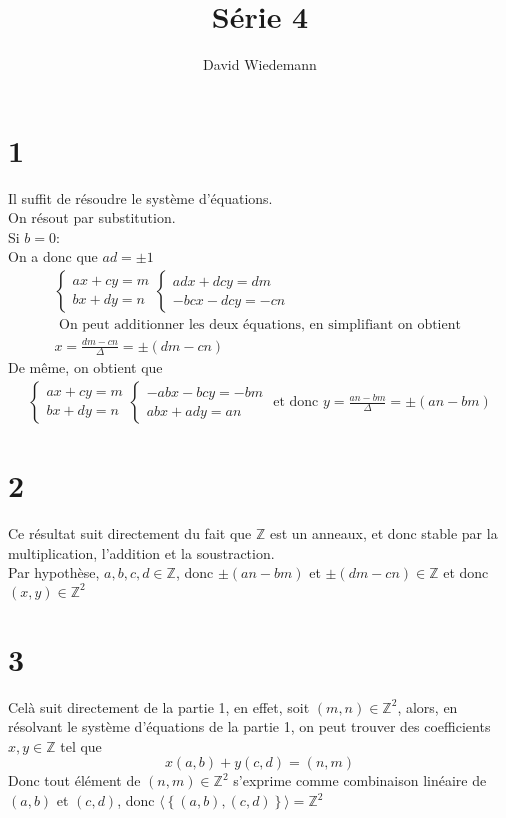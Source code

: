 \documentclass[11pt, a4paper, twoside]{article}
\begin{document}
\title{Série 4}
\author{David Wiedemann}
\maketitle
\section*{1}
Il suffit de résoudre le système d'équations.\\
On résout par substitution.\\
Si $b=0$:\\
On a donc que $ad = \pm 1$
\begin{align*}
\begin{cases}
ax+ cy = m\\
bx + dy = n
\end{cases}
\begin{cases}
adx + dcy = dm\\
-bcx - dcy = -cn
\end{cases}\\
\text{ On peut additionner les deux équations, en simplifiant on obtient }\\
x  = \frac{dm-cn}{\Delta} =\pm( dm - cn )
\end{align*}
De même, on obtient que
\begin{align*}
	\begin{cases}
	ax+ cy = m\\
	bx + dy = n
	\end{cases}
\begin{cases}
	-abx -bcy = -bm\\
	abx + ady = an	
\end{cases}
\text{ et donc } 
y = \frac{an-bm}{\Delta}= \pm( an-bm )
\end{align*}

\section*{2}

Ce résultat suit directement du fait que $\mathbb{Z}$ est un anneaux, et donc stable par la multiplication, l'addition et la soustraction.\\
Par hypothèse, $a, b,c,d \in \mathbb{Z}$, donc $\pm (an-bm)$ et $\pm ( dm-cn) \in \mathbb{Z}$ et donc $(x,y) \in \mathbb{Z}^{2}$
\section*{3}
Celà suit directement de la partie 1, en effet, soit $(m,n) \in \mathbb{Z}^{2}$, alors, en résolvant le  système d'équations de la partie 1, on peut trouver des coefficients $x, y \in \mathbb{Z}$ tel que 
\[ 
	x(a,b) + y(c,d) = ( n,m)
\]
Donc tout élément de $(n,m) \in \mathbb{Z}^{2}$ s'exprime comme combinaison linéaire de $(a,b)$ et $(c,d)$, donc
$\langle \left\{ ( a,b), ( c,d) \right\} \rangle = \mathbb{Z}^{2} $
\end{document}
